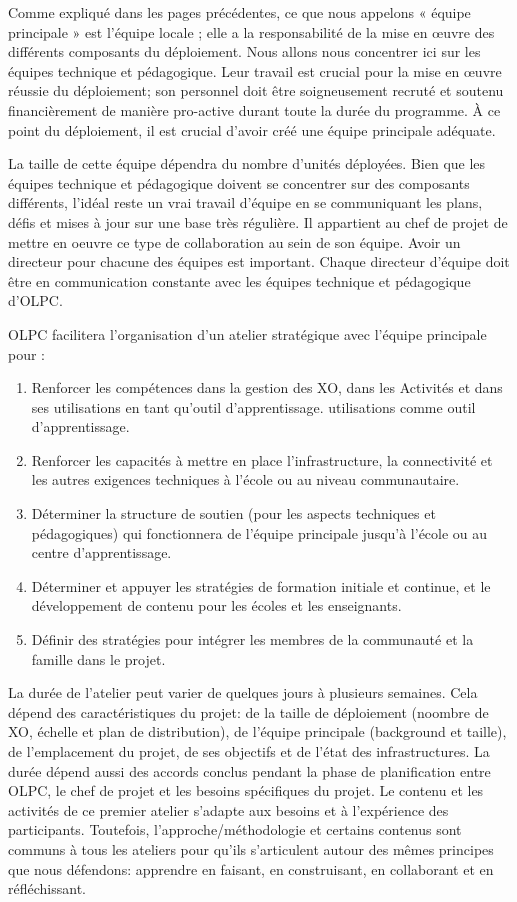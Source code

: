 \documentclass[12pt]{article}
\begin{document}

Comme expliqué dans les pages précédentes, ce que nous appelons « équipe
principale » est l'équipe locale ; elle a la responsabilité de la mise en
œuvre des différents composants du déploiement. Nous allons nous concentrer
ici sur les équipes technique et pédagogique. Leur travail est crucial pour
la mise en œuvre réussie du déploiement; son personnel doit être
soigneusement recruté et soutenu financièrement de manière pro-active
durant toute la durée du programme. À ce point du déploiement, il est
crucial d'avoir créé une équipe principale adéquate.


La taille de cette équipe dépendra du nombre d'unités déployées. Bien que
les équipes technique et pédagogique doivent se concentrer sur des
composants différents, l'idéal reste un vrai travail d'équipe en se
communiquant les plans, défis et mises à jour sur une base très
régulière. Il appartient au chef de projet de mettre en oeuvre ce type de
collaboration au sein de son équipe. Avoir un directeur pour chacune des
équipes est important. Chaque directeur d'équipe doit être en communication
constante avec les équipes technique et pédagogique d’OLPC.

OLPC facilitera l'organisation d'un atelier stratégique avec l'équipe
principale pour :

\begin{enumerate}
\item Renforcer les compétences dans la gestion des XO, dans les Activités et
   dans ses utilisations en tant qu'outil d'apprentissage.  utilisations
   comme outil d'apprentissage.
\item Renforcer les capacités à mettre en place l'infrastructure, la
   connectivité et les autres exigences techniques à l'école ou au niveau
   communautaire.
\item Déterminer la structure de soutien (pour les aspects techniques et
   pédagogiques) qui fonctionnera de l'équipe principale jusqu'à l'école ou
   au centre d'apprentissage.
\item Déterminer et appuyer les stratégies de formation initiale et continue,
   et le développement de contenu pour les écoles et les enseignants.
\item Définir des stratégies pour intégrer les membres de la communauté et la
   famille dans le projet.
\end{enumerate}

La durée de l'atelier peut varier de quelques jours à plusieurs
semaines. Cela dépend des caractéristiques du projet: de la taille de
déploiement (noombre de XO, échelle et plan de distribution), de l'équipe
principale (background et taille), de l'emplacement du projet, de ses
objectifs et de l'état des infrastructures. La durée dépend aussi des
accords conclus pendant la phase de planification entre OLPC, le chef de
projet et les besoins spécifiques du projet. Le contenu et les activités de
ce premier atelier  s'adapte aux besoins et à l'expérience des
participants. Toutefois, l'approche/méthodologie et certains contenus sont
communs à tous les ateliers pour qu'ils s'articulent autour des mêmes
principes que nous défendons: apprendre en faisant, en construisant, en
collaborant et en réfléchissant.
\end{document}

